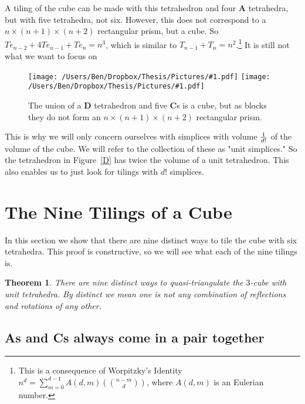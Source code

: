 \documentclass[12pt]{scrippsthesis}
\newcommand{\pic}[2]{\texttt{[image: /Users/Ben/Dropbox/Thesis/Pictures/\#1.pdf]}}
\newcommand{\mchoose}[2]{{\textstyle \left( \! {#1 \choose #2} \! \right)}}
\newtheorem{thm}{Theorem}[section]
\theoremstyle{definition}
\theoremstyle{remark}
\theoremstyle{plain}
\begin{document}
A tiling of the cube can be made with this tetrahedron and four {\bf A} tetrahedra, but with five tetrahedra, not six.  However, this does not correspond to a $n \times (n+1) \times (n+2)$ rectangular prism, but a cube.  So $Te_{n-2}+4Te_{n-1} +Te_n = n^3$, which is similar to $T_{n-1}+T_n = n^2$.\footnote{ This is a consequence of Worpitzky's Identity $n^d = \sum_{m=0}^{d-1} A(d,m) \mchoose{n-m}{d}$, where $A(d,m)$ is an Eulerian number.}  It is still not what we want to focus on

\begin{figure}[H]
\centerline{\hfill
\pic{Dtiling}{width=2in}\hfill
\pic{Dtiling-blocks}{width=2in}\hfill
}
\caption{ The union of a {\bf D} tetrahedron and five {\bf C}s is a cube, but as blocks they do not form an $n\times (n+1)\times (n+2)$ rectangular prism.  }
\end{figure}

This is why we will only concern ourselves with simplices with volume ${1\over d!}$ of the volume of the cube.  We will refer to the collection of these as "unit simplices."  So the tetrahedron in Figure~\ref{D} has twice the volume of a unit tetrahedron.  This also enables us to just look for tilings with $d!$ simplices. 


\section{The Nine Tilings of a Cube}

In this section we show that there are nine distinct ways to tile the cube with six tetrahedra.  This proof is constructive, so we will see what each of the nine tilings is.

\begin{thm} There are nine distinct ways to quasi-triangulate the $3$-cube with unit tetrahedra.  By distinct we mean one is not any combination of reflections and rotations of any other.
\end{thm}


\subsection{{\bf A}s and {\bf C}s always come in a pair together}
\end{document}
